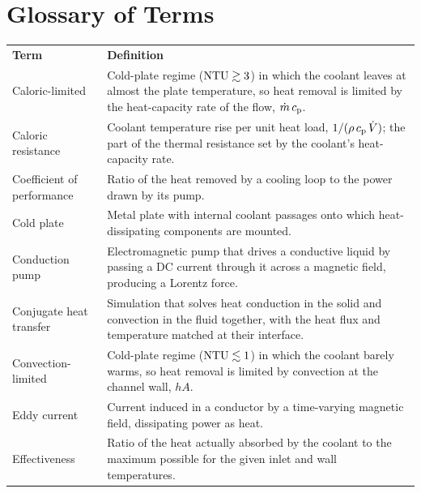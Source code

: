 \chapter*{Glossary of Terms}

\begin{longtable}[l]{>{\raggedright}p{}>{\raggedright\arraybackslash}p{}}
\textbf{Term} & \textbf{Definition} \\
\addlinespace
Caloric-limited & Cold-plate regime ($\mathrm{NTU} \gtrsim 3$) in which the coolant leaves at almost the plate temperature, so heat removal is limited by the heat-capacity rate of the flow, $\dot{m}\,c_{\mathrm{p}}$. \\
\addlinespace
Caloric resistance & Coolant temperature rise per unit heat load, $1/(\rho\,c_{\mathrm{p}}\,\dot{V})$; the part of the thermal resistance set by the coolant's heat-capacity rate. \\
\addlinespace
Coefficient of performance & Ratio of the heat removed by a cooling loop to the power drawn by its pump. \\
\addlinespace
Cold plate & Metal plate with internal coolant passages onto which heat-dissipating components are mounted. \\
\addlinespace
Conduction pump & Electromagnetic pump that drives a conductive liquid by passing a DC current through it across a magnetic field, producing a Lorentz force. \\
\addlinespace
Conjugate heat transfer & Simulation that solves heat conduction in the solid and convection in the fluid together, with the heat flux and temperature matched at their interface. \\
\addlinespace
Convection-limited & Cold-plate regime ($\mathrm{NTU} \lesssim 1$) in which the coolant barely warms, so heat removal is limited by convection at the channel wall, $hA$. \\
\addlinespace
Eddy current & Current induced in a conductor by a time-varying magnetic field, dissipating power as heat. \\
\addlinespace
Effectiveness & Ratio of the heat actually absorbed by the coolant to the maximum possible for the given inlet and wall temperatures. \\

\end{longtable}
